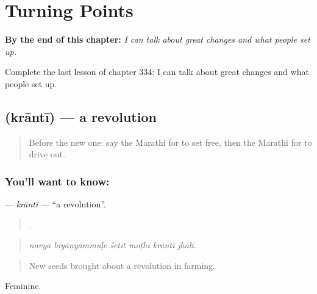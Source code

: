 
\chapter{Turning Points}
\label{ch:mr-turning-points}

\begin{chapteropening}
\textbf{By the end of this chapter:} \emph{I can talk about great changes and what people set up.}

Complete the last lesson of chapter 334: I can talk about great changes and what people set up.
\end{chapteropening}

\section[\texorpdfstring{\mr{क्रांती} (krāntī)}{क्रांती (krāntī)}]{ (krāntī) — a revolution}

\label{lesson:MR-C334-kranti}



\begin{quote}
Before the new one: say the Marathi for to set free, then the Marathi for to drive out.
\end{quote}

\subsection*{You'll want to know: }
\textbf{} — \emph{krāntī} — \textquotedblleft{}a revolution\textquotedblright{}.

\begin{quote}
     .
\end{quote}

\begin{quote}
\emph{navyā biyāṇyāmmuḷe śetīt moṭhī krāntī jhālī.}
\end{quote}

\begin{quote}
New seeds brought about a revolution in farming.
\end{quote}

Feminine.

